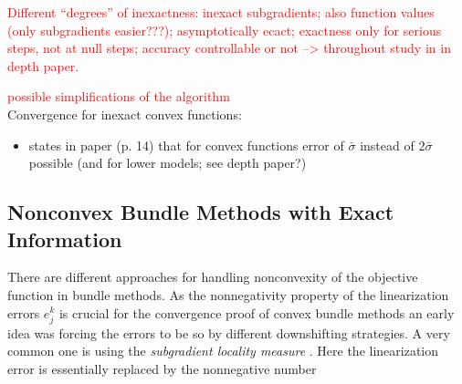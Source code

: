 \textcolor{red}{Different ``degrees'' of inexactness: inexact subgradients; also function values (only subgradients easier???); asymptotically ecact; exactness only for serious steps, not at null steps; accuracy controllable or not --> throughout study in in depth paper.}

\textcolor{red}{possible simplifications of the algorithm} \\


Convergence for inexact convex functions:
\begin{itemize}
	\item states in paper \cite{Hare2016} (p. 14) that for convex functions error of \(\bar{\sigma}\) instead of \(2\bar{\sigma}\) possible (and for lower models; see depth paper?)
\end{itemize}



\subsection{Nonconvex Bundle Methods with Exact Information}

%
%


There are different approaches for handling nonconvexity of the objective function in bundle methods.
As the nonnegativity property of the linearization errors \(e_j^k\) is crucial for the convergence proof of convex bundle methods an early idea was forcing the errors to be so by different downshifting strategies. A very common one is using the \emph{subgradient locality measure} \cite{Kiwiel1986, Mifflin1982}. Here the linearization error is essentially replaced by the nonnegative number

